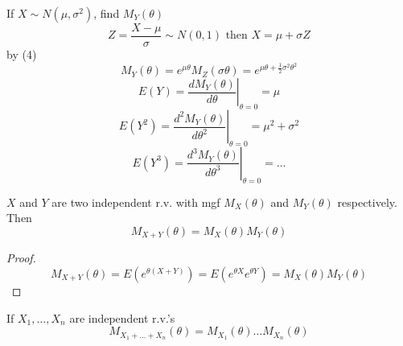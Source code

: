 \begin{exmp}
If $X \sim N(\mu,\sigma^2)$, find $M_Y(\theta)$
\[Z=\frac{X-\mu}{\sigma}\sim N(0,1) \text{ then } X=\mu+\sigma Z\]
by (4)
\[M_Y(\theta)=e^{\mu \theta} M_Z(\sigma \theta)=e^{\mu\theta+\frac{1}{2} \sigma^2\theta^2}\]
\[E(Y)=\left.\frac{d M_Y(\theta)}{d \theta}\right|_{\theta=0}=\mu\]
\[E(Y^2)=\left.\frac{d^2 M_Y(\theta)}{d \theta^2}\right|_{\theta=0}=\mu^2+\sigma^2\]
\[E(Y^3)=\left.\frac{d^3 M_Y(\theta)}{d \theta^3}\right|_{\theta=0}=\dots\]
\end{exmp}

\begin{theo}
$X$ and $Y$ are two independent r.v. with mgf $M_X(\theta)$ and $M_Y(\theta)$ respectively. Then 
\[M_{X+Y}(\theta)=M_X(\theta)M_Y(\theta)\]
\begin{proof}
\[M_{X+Y}(\theta)=E(e^{\theta(X+Y)})=E(e^{\theta X} e^{\theta Y})=M_X(\theta)M_Y(\theta)\]
\end{proof}
\end{theo}

\begin{coro}
If $X_1,\dots,X_n$ are independent r.v.'s
\[M_{X_1+\dots+X_n}(\theta)=M_{X_1}(\theta)\dots M_{X_n}(\theta)\]
\end{coro}

